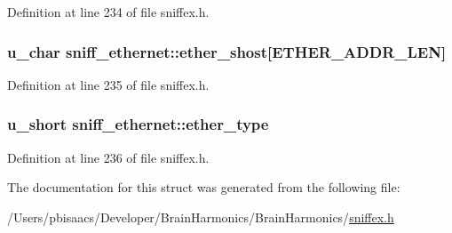 Definition at line 234 of file sniffex.\+h.

\subsubsection[{\texorpdfstring{ether\+\_\+shost}{ether_shost}}]{\setlength{\rightskip}{0pt plus 5cm}u\+\_\+char sniff\+\_\+ethernet\+::ether\+\_\+shost\mbox{[}{\bf E\+T\+H\+E\+R\+\_\+\+A\+D\+D\+R\+\_\+\+L\+EN}\mbox{]}}\hypertarget{structsniff__ethernet_afe9a93573af998a8652b2c8b1694dd51}{}\label{structsniff__ethernet_afe9a93573af998a8652b2c8b1694dd51}


Definition at line 235 of file sniffex.\+h.

\subsubsection[{\texorpdfstring{ether\+\_\+type}{ether_type}}]{\setlength{\rightskip}{0pt plus 5cm}u\+\_\+short sniff\+\_\+ethernet\+::ether\+\_\+type}\hypertarget{structsniff__ethernet_ae66770fd4e71d27c6a6619670bac2efb}{}\label{structsniff__ethernet_ae66770fd4e71d27c6a6619670bac2efb}


Definition at line 236 of file sniffex.\+h.



The documentation for this struct was generated from the following file\+:\begin{DoxyCompactItemize}
\item 
/\+Users/pbisaacs/\+Developer/\+Brain\+Harmonics/\+Brain\+Harmonics/\hyperlink{sniffex_8h}{sniffex.\+h}\end{DoxyCompactItemize}
